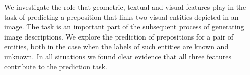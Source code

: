 We investigate the role that geometric, textual and visual features play in the task of predicting a preposition that links two visual entities depicted in an image. The task is an important part of the subsequent process of generating image descriptions. We explore the prediction of prepositions for a pair of entities, both in the case when the labels of such entities are known and unknown. In all situations we found clear evidence that all three features contribute to the prediction task.
